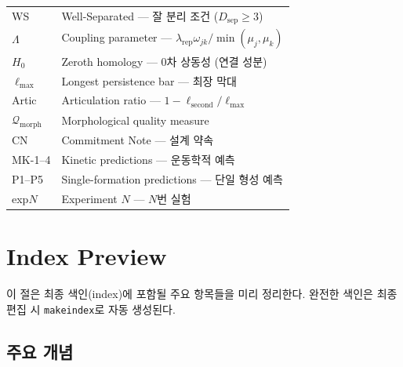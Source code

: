 \begin{longtable}{lp{11cm}}
WS & Well-Separated --- 잘 분리 조건 ($D_{\mathrm{sep}} \geq 3$) \\
$\Lambda$ & Coupling parameter --- $\lambda_{\mathrm{rep}} \omega_{jk}/\min(\mu_j,\mu_k)$ \\
\hline
$H_0$ & Zeroth homology --- 0차 상동성 (연결 성분) \\
$\ell_{\max}$ & Longest persistence bar --- 최장 막대 \\
Artic & Articulation ratio --- $1 - \ell_{\mathrm{second}}/\ell_{\max}$ \\
$\mathcal{Q}_{\mathrm{morph}}$ & Morphological quality measure \\
\hline
CN & Commitment Note --- 설계 약속 \\
MK-1--4 & Kinetic predictions --- 운동학적 예측 \\
P1--P5 & Single-formation predictions --- 단일 형성 예측 \\
exp$N$ & Experiment $N$ --- $N$번 실험 \\
\hline
\end{longtable}


\section{Index Preview}
\label{app:index-preview}

이 절은 최종 색인(index)에 포함될 주요 항목들을 미리 정리한다. 완전한 색인은 최종 편집 시 \texttt{makeindex}로 자동 생성된다.


\subsection{주요 개념}


